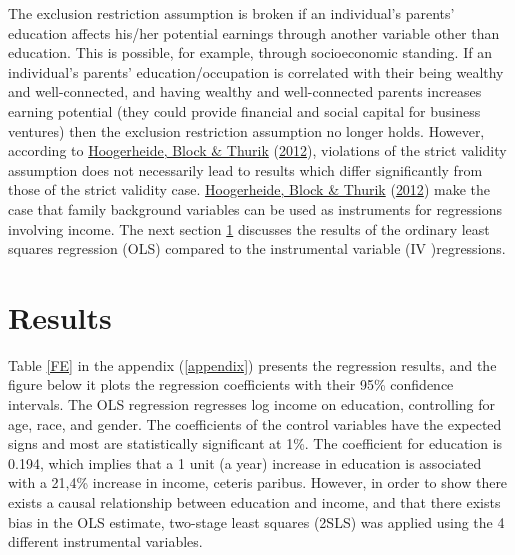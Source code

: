\documentclass[11pt,preprint, authoryear]{elsarticle}
\numberwithin{equation}{section}
\numberwithin{figure}{section}
\numberwithin{table}{section}
\begin{document}
The exclusion restriction assumption is broken if an individual's
parents' education affects his/her potential earnings through another
variable other than education. This is possible, for example, through
socioeconomic standing. If an individual's parents' education/occupation
is correlated with their being wealthy and well-connected, and having
wealthy and well-connected parents increases earning potential (they
could provide financial and social capital for business ventures) then
the exclusion restriction assumption no longer holds. However, according
to \protect\hyperlink{ref-block}{Hoogerheide, Block \& Thurik}
(\protect\hyperlink{ref-block}{2012}), violations of the strict validity
assumption does not necessarily lead to results which differ
significantly from those of the strict validity case.
\protect\hyperlink{ref-block}{Hoogerheide, Block \& Thurik}
(\protect\hyperlink{ref-block}{2012}) make the case that family
background variables can be used as instruments for regressions
involving income. The next section \ref{results} discusses the results
of the ordinary least squares regression (OLS) compared to the
instrumental variable (IV )regressions.

\hypertarget{results}{%
\section{\texorpdfstring{Results
\label{results}}{Results }}\label{results}}

Table \ref{FE} in the appendix (\ref{appendix}) presents the regression
results, and the figure below it plots the regression coefficients with
their 95\% confidence intervals. The OLS regression regresses log income
on education, controlling for age, race, and gender. The coefficients of
the control variables have the expected signs and most are statistically
significant at 1\%. The coefficient for education is 0.194, which
implies that a 1 unit (a year) increase in education is associated with
a 21,4\% increase in income, ceteris paribus. However, in order to show
there exists a causal relationship between education and income, and
that there exists bias in the OLS estimate, two-stage least squares
(2SLS) was applied using the 4 different instrumental variables.
\end{document}
